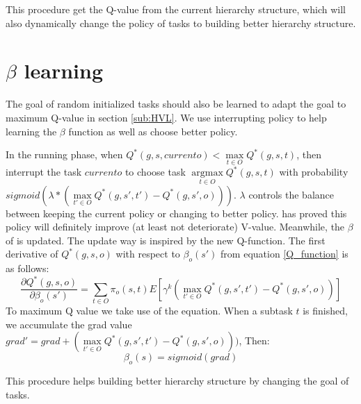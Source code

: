 \documentclass{article}
\begin{document}
This procedure get the Q-value from the current hierarchy structure, which will also dynamically change the policy of tasks to building better hierarchy structure.

\section{$\beta$ learning} \label{beta_learning}
The goal of random initialized tasks should also be learned to adapt the goal to maximum Q-value in section \ref{sub:HVL}. We use interrupting policy to help learning the $\beta$ function as well as choose better policy.

In the running phase, when $Q^*(g,s,currento)<\max \limits_{t\in O}{Q^*(g,s,t)}$, then interrupt the task $currento$ to choose task $\mathop{argmax} \limits_{t\in O}{Q^*(g,s,t)}$ with probability $sigmoid(\lambda * (\max \limits_{t'\in O}Q^*(g,s',t')-Q^*(g,s',o)))$. $\lambda$ controls the balance between keeping the current policy or changing to better policy.\cite{sutton1999between} has proved this policy will definitely improve (at least not deteriorate) V-value. Meanwhile, the $\beta$ of is updated. The update way is inspired by the new Q-function. The first derivative of $Q^*(g,s,o)$ with respect to $\beta_o(s')$ from equation \ref{Q_function} is as follows:
\begin{equation}
\frac{\partial Q^*(g,s,o)}{\partial \beta_o(s')}=\sum_{t\in O}{\pi_o(s,t)E[\gamma^k(\max \limits_{t'\in O}Q^*(g,s',t')-Q^*(g,s',o))]}
\end{equation}
To maximum Q value we take use of the equation. When a subtask $t$ is finished, we accumulate the grad value $grad'=grad+(\max \limits_{t'\in O}Q^*(g,s',t')-Q^*(g,s',o)))$, Then:
\begin{equation}
\beta_o(s)=sigmoid(grad)
\end{equation}

This procedure helps building better hierarchy structure by changing the goal of tasks.
\end{document}
